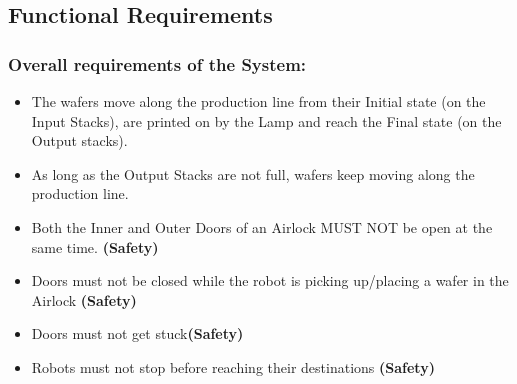 \documentclass[a4paper,12pt]{article}
\begin{document}
\subsection{Functional Requirements}
\subsubsection{Overall requirements of the System:}
\begin{itemize}
\item The wafers move along the production line from their Initial state (on the Input Stacks), are printed on by the Lamp and reach the Final state (on the Output stacks).
\item As long as the Output Stacks are not full, wafers keep moving along the production line.
\item Both the Inner and Outer Doors of an Airlock MUST NOT be open at the same time.\textbf{ (Safety)}
\item Doors must not be closed while the robot is picking up/placing a wafer in the Airlock\textbf{ (Safety)}
\item Doors must not get stuck\textbf{(Safety)}
\item Robots must not stop before reaching their destinations\textbf{ (Safety)}
\end{itemize}
\end{document}
